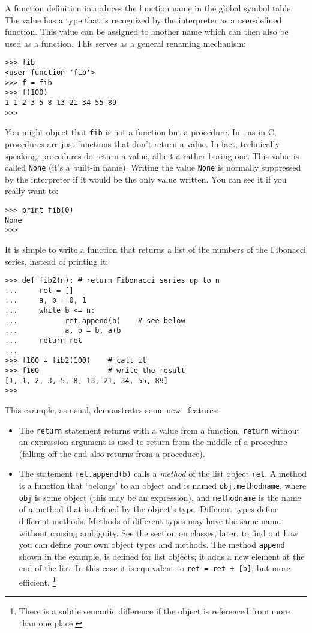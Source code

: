 A function definition introduces the function name in the global symbol
table.
The value has a type that is recognized by the interpreter as a
user-defined function.
This value can be assigned to another name which can then also be used
as a function.
This serves as a general renaming mechanism:
\begin{code}\begin{verbatim}
>>> fib
<user function 'fib'>
>>> f = fib
>>> f(100)
1 1 2 3 5 8 13 21 34 55 89
>>> 
\end{verbatim}\end{code}
You might object that
{\tt fib}
is not a function but a procedure.
In \Python, as in C, procedures are just functions that don't return a
value.
In fact, technically speaking, procedures do return a value, albeit a
rather boring one.
This value is called {\tt None} (it's a built-in name).
Writing the value {\tt None} is normally suppressed by the interpreter
if it would be the only value written.
You can see it if you really want to:
\begin{code}\begin{verbatim}
>>> print fib(0)
None
>>> 
\end{verbatim}\end{code}
It is simple to write a function that returns a list of the numbers of
the Fibonacci series, instead of printing it:
\begin{code}\begin{verbatim}
>>> def fib2(n): # return Fibonacci series up to n
...     ret = []
...     a, b = 0, 1
...     while b <= n:
...           ret.append(b)    # see below
...           a, b = b, a+b
...     return ret
... 
>>> f100 = fib2(100)    # call it
>>> f100                # write the result
[1, 1, 2, 3, 5, 8, 13, 21, 34, 55, 89]
>>> 
\end{verbatim}\end{code}
This example, as usual, demonstrates some new \Python\ features:
\begin{itemize}
\item
The
{\tt return}
statement returns with a value from a function.
{\tt return}
without an expression argument is used to return from the middle of a
procedure (falling off the end also returns from a proceduce).
\item
The statement
{\tt ret.append(b)}
calls a
{\it method}
of the list object
{\tt ret}.
A method is a function that `belongs' to an object and is named
{\tt obj.methodname},
where
{\tt obj}
is some object (this may be an expression), and
{\tt methodname}
is the name of a method that is defined by the object's type.
Different types define different methods.
Methods of different types may have the same name without causing
ambiguity.
See the section on classes, later, to find out how you can define your
own object types and methods.
The method
{\tt append}
shown in the example, is defined for list objects; it adds a new element
at the end of the list.
In this case it is equivalent to
{\tt ret = ret + [b]},
but more efficient.%
\footnote{
	There is a subtle semantic difference if the object
	is referenced from more than one place.
}
\end{itemize}
